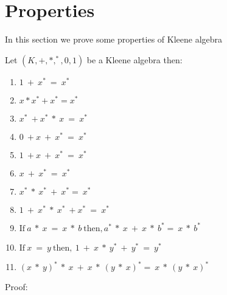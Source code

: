 \section{Properties}
In this section we prove some properties of Kleene algebra

Let $(K, +, *, ^{*}, 0, 1)$ be a Kleene algebra then:
\begin{enumerate}
\item $1\ +\ x^{*}\ =\ x^{*}$
\item $x * x^{*} + x^{*} = x^{*}$
\item $x^{*}\  + x^{*}\ *\ x\ =\ x^{*}$
\item $0\ + x\ +\ x^{*}\ =\ x^{*}$
\item $1\ + x\ +\ x^{*}\ =\ x^{*}$
\item $x\ +\ x^{*}\ =\ x^{*}$
\item $x^{*}\ *\ x^{*}\ +\ x^{*} =\ x^{*}$
\item $1 \ +\ x^{*}\ *\ x^{*}\ + x^{*}\ =\ x^{*}$
\item $\text{If}\ a\ *\ x\ =\ x\ *\ b\ \text{then}, a^{*}\ *\ x\ +\ x\ *\ b^{*} =\ x\ *\ b^{*}$
\item $\text{If}\ x\ =\ y\ \text{then},\ 1\ +\ x\ *\ y^{*}\ + \ y^{*}\ =\ y^{*}$
\item $(x\ *\ y)^{*}\ *\ x\ +\ x\ *\ (y\ *\ x)^{*} =\ x\ *\ (y\ *\ x)^{*}$
\end{enumerate}
Proof:
